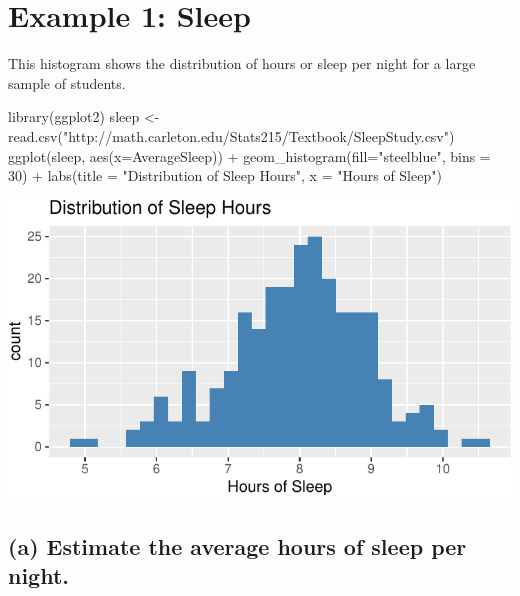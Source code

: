 \documentclass[
]{book}
\newenvironment{Shaded}{\begin{snugshade}}{\end{snugshade}}
\newcommand{\AttributeTok}[1]{\textcolor[rgb]{0.77,0.63,0.00}{#1}}
\newcommand{\DecValTok}[1]{\textcolor[rgb]{0.00,0.00,0.81}{#1}}
\newcommand{\FunctionTok}[1]{\textcolor[rgb]{0.00,0.00,0.00}{#1}}
\newcommand{\NormalTok}[1]{#1}
\newcommand{\OtherTok}[1]{\textcolor[rgb]{0.56,0.35,0.01}{#1}}
\newcommand{\SpecialCharTok}[1]{\textcolor[rgb]{0.00,0.00,0.00}{#1}}
\newcommand{\StringTok}[1]{\textcolor[rgb]{0.31,0.60,0.02}{#1}}
\begin{document}
\hypertarget{example-1-sleep}{%
\section{Example 1: Sleep}\label{example-1-sleep}}

This histogram shows the distribution of hours or sleep per night for a large sample of students.

\begin{Shaded}
\begin{Highlighting}[]
\FunctionTok{library}\NormalTok{(ggplot2)}
\NormalTok{sleep }\OtherTok{\textless{}{-}} \FunctionTok{read.csv}\NormalTok{(}\StringTok{"http://math.carleton.edu/Stats215/Textbook/SleepStudy.csv"}\NormalTok{)}
\FunctionTok{ggplot}\NormalTok{(sleep, }\FunctionTok{aes}\NormalTok{(}\AttributeTok{x=}\NormalTok{AverageSleep)) }\SpecialCharTok{+}
  \FunctionTok{geom\_histogram}\NormalTok{(}\AttributeTok{fill=}\StringTok{"steelblue"}\NormalTok{, }\AttributeTok{bins =} \DecValTok{30}\NormalTok{) }\SpecialCharTok{+}
  \FunctionTok{labs}\NormalTok{(}\AttributeTok{title =} \StringTok{"Distribution of Sleep Hours"}\NormalTok{, }\AttributeTok{x =} \StringTok{"Hours of Sleep"}\NormalTok{)}
\end{Highlighting}
\end{Shaded}

\includegraphics[width=1\linewidth]{Class_Activity_5_files/figure-latex/unnamed-chunk-1-1}

\hypertarget{a-estimate-the-average-hours-of-sleep-per-night.}{%
\subsection{(a) Estimate the average hours of sleep per night.}\label{a-estimate-the-average-hours-of-sleep-per-night.}}
\end{document}
